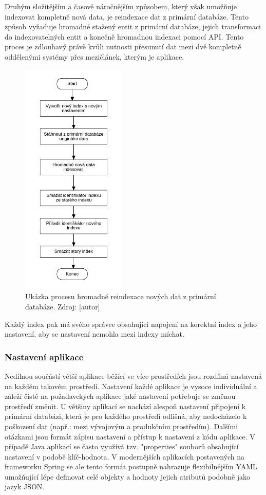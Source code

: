 		Druhým složitějším a časově náročnějším způsobem, který však umožňuje indexovat kompletně nová data, je
		reindexace dat z primární databáze.
		Tento způsob vyžaduje hromadné stažený entit z primární databáze, jejich transformaci do indexovatelných entit
		a konečně hromadnou indexaci pomocí \ac{API}.
		Tento proces je zdlouhavý právě kvůli nutnosti přesunutí dat mezi dvě kompletně oddělenými systémy přes mezičlánek,
		kterým je aplikace.

		\begin{figure}[H]
			\centering
			\includegraphics[width=5cm]{obrazky/proces_reindexace_z_db}\hfill
			\caption{Ukázka procesu hromadné reindexace nových dat z primární databáze. Zdroj: [autor]}
		\end{figure}

		Každý index pak má svého správce obsahující napojení na korektní index a jeho nastavení, aby se nastavení nemohla
		mezi indexy míchat.

		\subsubsection{Nastavení aplikace}

		Nedílnou součástí větší aplikace běžící ve více prostředích jsou rozdílná nastavená na každém takovém prostředí.
		Nastavení každé aplikace je vysoce individuální a záleží čistě na požadavckých aplikace jaké nastavení potřebuje
		se změnou prostředí změnit.
		U většiny aplikací se nachází alespoň nastavení připojení k primární databázi, která je pro každého prostředí
		odlišná, aby nedocházelo k poškození dat (např.: mezi vývojovým a produkčním prostředím).
		Dalšími otázkami jsou formát zápisu nastavení a přístup k nastavení z kódu aplikace.
		V případě Java aplikací se často využívá tzv. "properties" souborů obsahující nastavení v podobě klíč-hodnota.
		V modernějších aplikacích postavených na frameworku Spring se ale tento formát postupně nahrazuje flexibilnějším
		\ac{YAML} umožňující lépe definovat celé objekty a hodnoty jejich atributů podobně jako jazyk \ac{JSON}.

